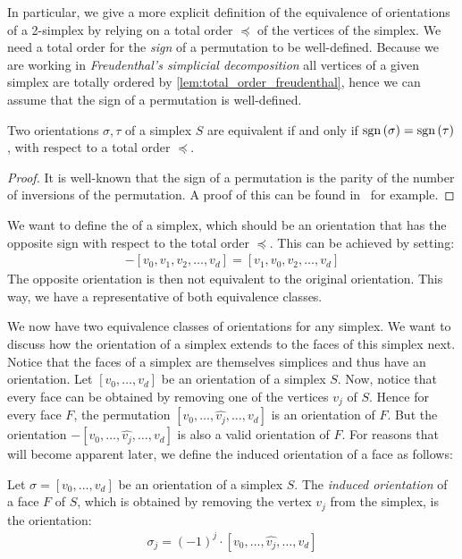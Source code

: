 In particular, we give a more explicit definition of the equivalence of orientations of a 2-simplex by relying on a total order $\preceq$ of the vertices of the simplex. We need a total order for the \emph{sign} of a permutation to be well-defined. Because we are working in \emph{Freudenthal's simplicial decomposition} all vertices of a given simplex are totally ordered by \cref{lem:total_order_freudenthal}, hence we can assume that the sign of a permutation is well-defined.

\begin{lemma}
	Two orientations $\sigma, \tau$ of a simplex $S$ are equivalent if and only if $\operatorname{sgn}\left(\sigma\right) = \operatorname{sgn}\left(\tau\right)$, with respect to a total order $\preceq$.
\end{lemma}
\begin{proof}
	It is well-known that the sign of a permutation is the parity of the number of inversions of the permutation. A proof of this can be found in~ for example.
\end{proof}

We want to define the  of a simplex, which should be an orientation that has the opposite sign with respect to the total order $\preceq$. This can be achieved by setting:
\begin{align*}
	- [v_0, v_1, v_2, \dots, v_d] = [v_1, v_0, v_2, \dots, v_d]
\end{align*}
The opposite orientation is then not equivalent to the original orientation. This way, we have a representative of both equivalence classes.

We now have two equivalence classes of orientations for any simplex. We want to discuss how the orientation of a simplex extends to the faces of this simplex next. Notice that the faces of a simplex are themselves simplices and thus have an orientation. Let $[v_0, \dots, v_{d}]$ be an orientation of a simplex $S$. Now, notice that every face can be obtained by removing one of the vertices $v_j$ of $S$. Hence for every face $F$, the permutation $[v_0, \dots, \hat{v_j}, \dots, v_{d}]$ is an orientation of $F$. But the orientation $- [v_0, \dots, \hat{v_j}, \dots, v_{d}]$ is also a valid orientation of $F$. For reasons that will become apparent later, we define the induced orientation of a face as follows:

\begin{definition}
	Let $\sigma = [v_0, \dots, v_{d}]$ be an orientation of a simplex $S$. The \emph{induced orientation} of a face $F$ of $S$, which is obtained by removing the vertex $v_j$ from the simplex, is the orientation:
	\begin{align*}
		\sigma_j = {(-1)}^j \cdot [v_0, \dots, \hat{v_j}, \dots, v_{d}]
	\end{align*}
\end{definition}

